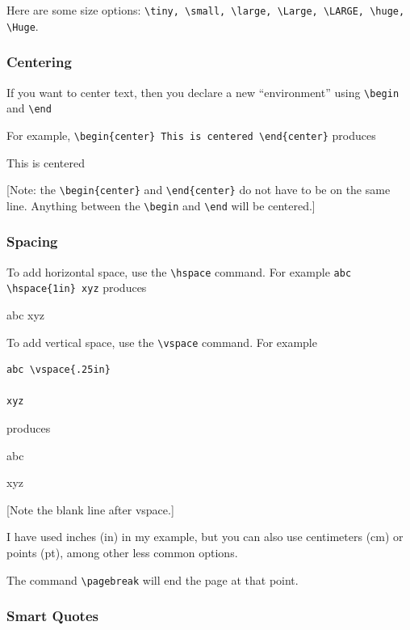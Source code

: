 \documentclass[12pt]{article}
\begin{document}
Here are some size options: \verb|\tiny, \small, \large, \Large, \LARGE, \huge, \Huge|.

\subsubsection{Centering}

If you want to center text, then you declare a new ``environment'' using \verb|\begin| and \verb|\end|

For example, \verb|\begin{center} This is centered \end{center}| produces
\begin{center} This is centered \end{center}

[Note: the \verb|\begin{center}| and \verb|\end{center}| do not have to be on the same line. Anything between the \verb|\begin| and \verb|\end| will be centered.]

\subsubsection{Spacing}

To add horizontal space, use the \verb|\hspace| command. For example \verb|abc \hspace{1in} xyz| produces

abc \hspace{1in} xyz

To add vertical space, use the \verb|\vspace| command. For example \begin{verbatim}
abc \vspace{.25in}

xyz
\end{verbatim}
produces

abc \vspace{.25in}

xyz

[Note the blank line after vspace.]

I have used inches (in) in my example, but you can also use centimeters (cm) or points (pt), among other less common options.

The command \verb|\pagebreak| will end the page at that point.

\subsubsection{Smart Quotes}
\end{document}
